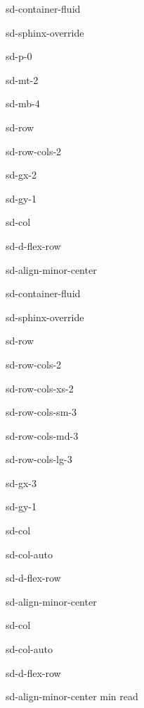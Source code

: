 \documentclass[letterpaper,10pt,english]{jupyterBook}
\begin{document}
\begin{sphinxuseclass}{sd-container-fluid}
\begin{sphinxuseclass}{sd-sphinx-override}
\begin{sphinxuseclass}{sd-p-0}
\begin{sphinxuseclass}{sd-mt-2}
\begin{sphinxuseclass}{sd-mb-4}
\begin{sphinxuseclass}{sd-row}
\begin{sphinxuseclass}{sd-row-cols-2}
\begin{sphinxuseclass}{sd-gx-2}
\begin{sphinxuseclass}{sd-gy-1}
\begin{sphinxuseclass}{sd-col}
\begin{sphinxuseclass}{sd-d-flex-row}
\begin{sphinxuseclass}{sd-align-minor-center}
\begin{sphinxuseclass}{sd-container-fluid}
\begin{sphinxuseclass}{sd-sphinx-override}
\begin{sphinxuseclass}{sd-row}
\begin{sphinxuseclass}{sd-row-cols-2}
\begin{sphinxuseclass}{sd-row-cols-xs-2}
\begin{sphinxuseclass}{sd-row-cols-sm-3}
\begin{sphinxuseclass}{sd-row-cols-md-3}
\begin{sphinxuseclass}{sd-row-cols-lg-3}
\begin{sphinxuseclass}{sd-gx-3}
\begin{sphinxuseclass}{sd-gy-1}
\begin{sphinxuseclass}{sd-col}
\begin{sphinxuseclass}{sd-col-auto}
\begin{sphinxuseclass}{sd-d-flex-row}
\begin{sphinxuseclass}{sd-align-minor-center}
\end{sphinxuseclass}
\end{sphinxuseclass}
\end{sphinxuseclass}
\end{sphinxuseclass}
\begin{sphinxuseclass}{sd-col}
\begin{sphinxuseclass}{sd-col-auto}
\begin{sphinxuseclass}{sd-d-flex-row}
\begin{sphinxuseclass}{sd-align-minor-center}
 min read

\end{sphinxuseclass}
\end{sphinxuseclass}
\end{sphinxuseclass}
\end{sphinxuseclass}
\end{sphinxuseclass}
\end{sphinxuseclass}
\end{sphinxuseclass}
\end{sphinxuseclass}
\end{sphinxuseclass}
\end{sphinxuseclass}
\end{sphinxuseclass}
\end{sphinxuseclass}
\end{sphinxuseclass}
\end{sphinxuseclass}
\end{sphinxuseclass}
\end{sphinxuseclass}
\end{sphinxuseclass}
\end{sphinxuseclass}
\end{sphinxuseclass}
\end{sphinxuseclass}
\end{sphinxuseclass}
\end{sphinxuseclass}
\end{sphinxuseclass}
\end{sphinxuseclass}
\end{sphinxuseclass}
\end{sphinxuseclass}
\end{document}
